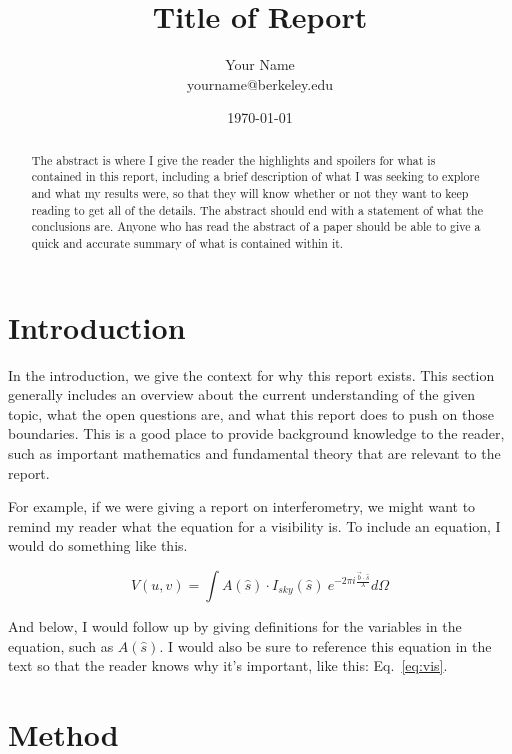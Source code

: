 \documentclass[preprint]{aastex}
\makeatletter
\newcommand{\thetitle}{Title of Report}
\newcommand{\theauthor}{Your Name}
\newcommand{\theauthorsemail}{yourname@berkeley.edu}
\newcommand{\thedate}{\today}
\makeatother
\begin{document}
\title{
    \sffamily\bfseries\huge
    \thetitle \\
}
\author{
    \sffamily\theauthor \\
    \sffamily\theauthorsemail
}
\date{\centering\thedate}
\begin{abstract}
The abstract is where I give the reader the highlights and spoilers for what is 
contained in this report, including a brief description of what I was seeking 
to explore and what my results were, so that they will know whether or not they 
want to keep reading to get all of the details. The abstract should end with a 
statement of what the conclusions are.  Anyone who has read the abstract of a 
paper should be able to give a quick and accurate summary of what is contained 
within it.
\end{abstract}

\section{Introduction}

In the introduction, we give the context for why this report exists. This 
section generally includes an overview about the current understanding of the 
given topic, what the open questions are, and what this report does to push on 
those boundaries. This is a good place to provide background knowledge to the 
reader, such as important mathematics and fundamental theory that are relevant 
to the report.

For example, if we were giving a report on interferometry, we might want to remind 
my reader what the equation for a visibility is. To include an equation, I 
would do something like this.

\begin{equation}
    \label{eq:vis}
    V(u,v) = \int A(\hat{s}) \cdot I_{sky}(\hat{s}) ~e^{-2 \pi i \frac{\vec{b} 
    \cdot \hat{s}}{\lambda}} d\Omega
\end{equation}

And below, I would follow up by giving definitions for the variables in the 
equation, such as $A(\hat{s})$. I would also be sure to reference this equation 
in the text so that the reader knows why it's important, like this: 
Eq.~\eqref{eq:vis}.

\section{Method}
\end{document}
